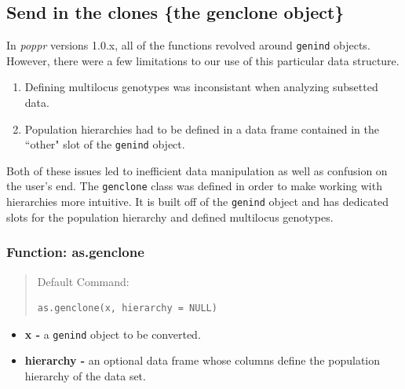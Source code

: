 \documentclass[letterpaper]{article}\usepackage[]{graphicx}\usepackage[]{color}
\makeatletter
\newenvironment{kframe}{%
 \def\at@end@of@kframe{}%
 \ifinner\ifhmode%
  \def\at@end@of@kframe{\end{minipage}}%
  \begin{minipage}{\columnwidth}%
 \fi\fi%
 \def\FrameCommand##1{\hskip\@totalleftmargin \hskip-\fboxsep
 \colorbox{shadecolor}{##1}\hskip-\fboxsep
     \hskip-\linewidth \hskip-\@totalleftmargin \hskip\columnwidth}%
 \MakeFramed {\advance\hsize-\width
   \@totalleftmargin\z@ \linewidth\hsize
   \@setminipage}}%
 {\par\unskip\endMakeFramed%
 \at@end@of@kframe}
\newenvironment{knitrout}{}{} %
\makeatother
\begin{document}
\subsection{Send in the clones \{the genclone object\}}\label{intro:genclone}

In \textit{poppr} versions 1.0.x, all of the functions revolved around
\texttt{genind} objects. However, there were a few limitations to our use of
this particular data structure.

\begin{enumerate}
  \item Defining multilocus genotypes was inconsistant when analyzing subsetted
        data.
  \item Population hierarchies had to be defined in a data frame contained in 
        the ``other" slot of the \texttt{genind} object. 
\end{enumerate}

Both of these issues led to inefficient data manipulation as well as confusion 
on the user's end. The \texttt{genclone} class was defined in order to make 
working with hierarchies more intuitive. It is built off of the 
\texttt{genind} object and has dedicated slots for the population hierarchy and
defined multilocus genotypes. 

\subsubsection{Function: as.genclone}\label{intro:genclone:as.genclone}
\begin{quote}
Default Command:
\begin{knitrout}
\color{fgcolor}\begin{kframe}
\begin{verbatim}
as.genclone(x, hierarchy = NULL)
\end{verbatim}
\end{kframe}
\end{knitrout}

\end{quote}
\begin{itemize}
  \item \textbf{x -} a \texttt{genind} object to be converted.
  \item \textbf{hierarchy -} an optional data frame whose columns define the 
  population hierarchy of the data set.
\end{itemize}
\end{document}
